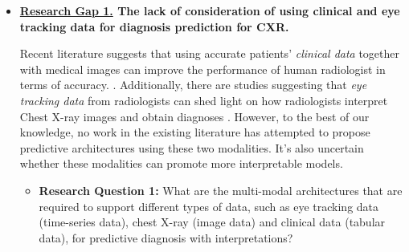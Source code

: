 \begin{itemize}
    \item \textbf{\underline{Research Gap 1.} The lack of consideration of using clinical and eye tracking data for diagnosis prediction for CXR.} 
    
    Recent literature suggests that using accurate patients' \textit{clinical data} together with medical images can improve the performance of human radiologist in terms of accuracy. \citep{Castillo2020ClinicalInformationOnRadiology, Leslie2000CTClinicalData}. Additionally, there are studies suggesting that \textit{eye tracking data} from radiologists can shed light on how radiologists interpret Chest X-ray images and obtain diagnoses \citep{Karargyris2021EyeGazePaper, Lanfredi2021REFLACX}. However, to the best of our knowledge, no work in the existing literature has attempted to propose predictive architectures using these two modalities. It's also uncertain whether these modalities can promote more interpretable models.
          \begin{itemize}
            \item \textbf{Research Question 1:} What are the multi-modal architectures that are required to support different types of data, such as eye tracking data (time-series data), chest X-ray (image data) and clinical data (tabular data), for predictive diagnosis with interpretations?
          
     
  
              
          \end{itemize}
          

\end{itemize}
